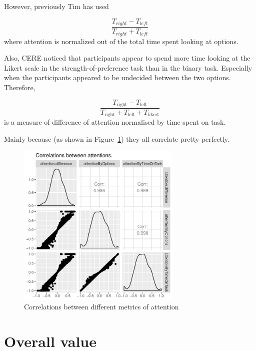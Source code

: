\documentclass[12pt]{article}
\begin{document}
However, previously Tim has used

\begin{equation}
	\frac{T_{right}-T_{left}}{T_{right}+T_{left}}
\end{equation}
where attention is normalized out of the total time spent looking at options. 

Also, CERE noticed that participants appear to spend more time looking at the Likert scale in the strength-of-preference task than in the binary task. Especially when the participants appeared to be undecided between the two options. Therefore, 

\begin{equation}
	\frac{T_\text{right}-T_\text{left}}{T_\text{right}+T_\text{left}+T_\text{likert}}
\end{equation}
is a measure of difference of attention normalised by time spent on task. 




Mainly because (as shown in Figure~\ref{figure:attentionCorrelations}) they all correlate pretty perfectly. 

\begin{figure}
	\centering
	\includegraphics[width=0.7\textwidth]{images/attentionCorrelations}
	\caption{Correlations between different metrics of attention}
	\label{figure:attentionCorrelations}
\end{figure}

\clearpage
\section{Overall value}
\end{document}
